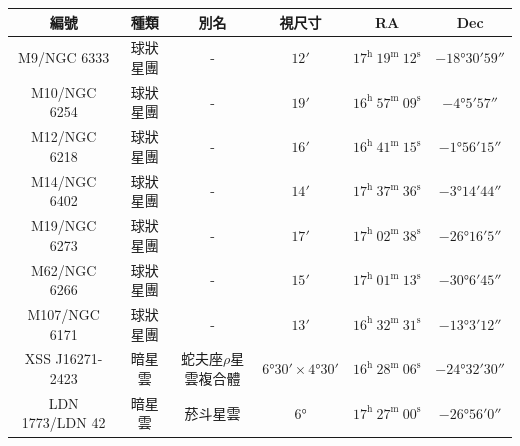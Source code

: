 \begin{center}
\begin{longtable}{c | c | c | c | c | c}
    編號 & 種類 & 別名 & 視尺寸 & RA & Dec \\
    \hline
    \endfirsthead


    \endfoot

    \endlastfoot

    M9/NGC 6333 & 球狀星團 & - & \(\ang{;12;}\) & \(17^\text{h }19^\text{m }12^\text{s}\) & \(-\ang{18;30;59}\) \\ %
    M10/NGC 6254 & 球狀星團 & - & \(\ang{;19;}\) & \(16^\text{h }57^\text{m }09^\text{s}\) & \(-\ang{4;5;57}\) \\ %
    M12/NGC 6218 & 球狀星團 & - & \(\ang{;16;}\) & \(16^\text{h }41^\text{m }15^\text{s}\) & \(-\ang{1;56;15}\) \\ %
    M14/NGC 6402 & 球狀星團 & - & \(\ang{;14;}\) & \(17^\text{h }37^\text{m }36^\text{s}\) & \(-\ang{3;14;44}\) \\ %
    M19/NGC 6273 & 球狀星團 & - & \(\ang{;17;}\) & \(17^\text{h }02^\text{m }38^\text{s}\) & \(-\ang{26;16;5}\) \\ %
    M62/NGC 6266 & 球狀星團 & - & \(\ang{;15;}\) & \(17^\text{h }01^\text{m }13^\text{s}\) & \(-\ang{30;6;45}\) \\ %
    M107/NGC 6171 & 球狀星團 & - & \(\ang{;13;}\) & \(16^\text{h }32^\text{m }31^\text{s}\) & \(-\ang{13;3;12}\) \\ %
    XSS J16271-2423 & 暗星雲 & 蛇夫座\(\rho\)星雲複合體 & \(\ang{6;30}\times\ang{4;30}\) & \(16^\text{h }28^\text{m }06^\text{s}\) & \(-\ang{24;32;30}\) \\ %
    LDN 1773/LDN 42 & 暗星雲 & 菸斗星雲 & \(\ang{6;;}\) & \(17^\text{h }27^\text{m }00^\text{s}\) & \(-\ang{26;56;0}\) \\
\end{longtable}
\end{center}

